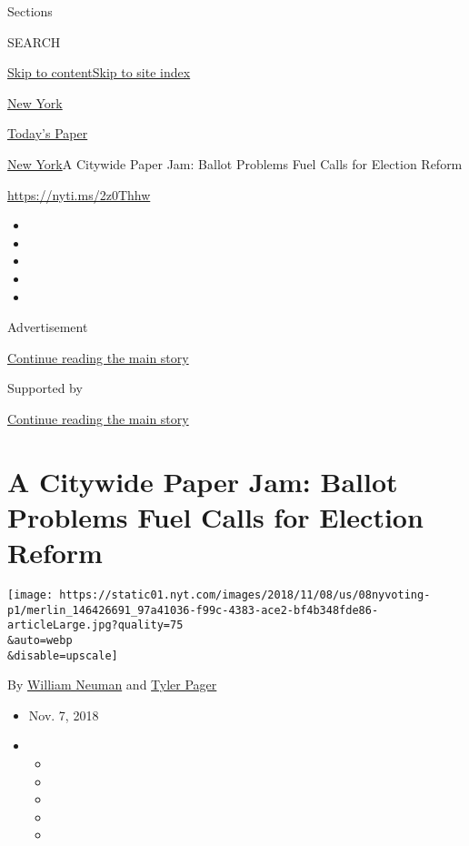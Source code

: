 Sections

SEARCH

\protect\hyperlink{site-content}{Skip to
content}\protect\hyperlink{site-index}{Skip to site index}

\href{https://www.nytimes.com/section/nyregion}{New York}

\href{https://myaccount.nytimes.com/auth/login?response_type=cookie\&client_id=vi}{}

\href{https://www.nytimes.com/section/todayspaper}{Today's Paper}

\href{/section/nyregion}{New York}\textbar{}A Citywide Paper Jam: Ballot
Problems Fuel Calls for Election Reform

\url{https://nyti.ms/2z0Thhw}

\begin{itemize}
\item
\item
\item
\item
\item
\end{itemize}

Advertisement

\protect\hyperlink{after-top}{Continue reading the main story}

Supported by

\protect\hyperlink{after-sponsor}{Continue reading the main story}

\hypertarget{a-citywide-paper-jam-ballot-problems-fuel-calls-for-election-reform}{%
\section{A Citywide Paper Jam: Ballot Problems Fuel Calls for Election
Reform}\label{a-citywide-paper-jam-ballot-problems-fuel-calls-for-election-reform}}

\texttt{[image: https://static01.nyt.com/images/2018/11/08/us/08nyvoting-p1/merlin\_146426691\_97a41036-f99c-4383-ace2-bf4b348fde86-articleLarge.jpg?quality=75\\\&auto=webp\\\&disable=upscale]}

By \href{https://www.nytimes.com/by/william-neuman}{William Neuman} and
\href{https://www.nytimes.com/by/tyler-pager}{Tyler Pager}

\begin{itemize}
\item
  Nov. 7, 2018
\item
  \begin{itemize}
  \item
  \item
  \item
  \item
  \item
  \end{itemize}
\end{itemize}

